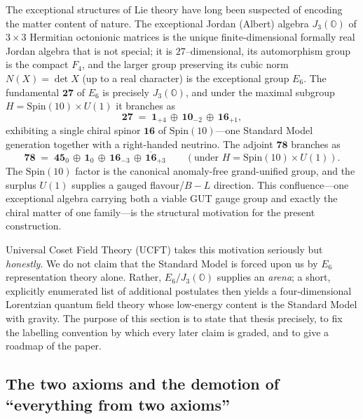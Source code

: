 \documentclass[11pt]{article}
\theoremstyle{plain}
\theoremstyle{definition}
\theoremstyle{remark}
\begin{document}
The exceptional structures of Lie theory have long been suspected of encoding
the matter content of nature. The exceptional Jordan (Albert) algebra
$J_{3}(\mathbb{O})$ of $3\times 3$ Hermitian octonionic matrices is the unique
finite-dimensional formally real Jordan algebra that is not special; it is
$27$--dimensional, its automorphism group is the compact $F_4$, and the larger
group preserving its cubic norm $N(X)=\det X$ (up to a real character) is the
exceptional group $E_6$. The fundamental $\mathbf{27}$ of $E_6$ is precisely
$J_{3}(\mathbb{O})$, and under the maximal subgroup
$H=\mathrm{Spin}(10)\times U(1)$ it branches as
\begin{equation}
  \mathbf{27} \;=\; \mathbf{1}_{+4}\,\oplus\,\mathbf{10}_{-2}\,\oplus\,\mathbf{16}_{+1},
  \label{eq:intro:27branch}
\end{equation}
exhibiting a single chiral spinor $\mathbf{16}$ of $\mathrm{Spin}(10)$---one
Standard Model generation together with a right-handed neutrino. The adjoint
$\mathbf{78}$ branches as
\begin{equation}
  \mathbf{78} \;=\; \mathbf{45}_{0}\,\oplus\,\mathbf{1}_{0}\,\oplus\,
  \mathbf{16}_{-3}\,\oplus\,\overline{\mathbf{16}}_{+3}
  \qquad (\text{under } H=\mathrm{Spin}(10)\times U(1)).
  \label{eq:intro:78branch}
\end{equation}
The $\mathrm{Spin}(10)$ factor is the canonical anomaly-free grand-unified
group, and the surplus $U(1)$ supplies a gauged flavour/$B\!-\!L$ direction.
This confluence---one exceptional algebra carrying both a viable GUT gauge group
and exactly the chiral matter of one family---is the structural motivation for
the present construction.

Universal Coset Field Theory (UCFT) takes this motivation seriously but
\emph{honestly}. We do not claim that the Standard Model is forced upon us by
$E_6$ representation theory alone. Rather, $E_6/J_3(\mathbb{O})$ supplies an
\emph{arena}; a short, explicitly enumerated list of additional postulates then
yields a four-dimensional Lorentzian quantum field theory whose low-energy
content is the Standard Model with gravity. The purpose of this section is to
state that thesis precisely, to fix the labelling convention by which every
later claim is graded, and to give a roadmap of the paper.

\subsection{The two axioms and the demotion of ``everything from two axioms''}
\label{sec:intro:axioms}
\end{document}
